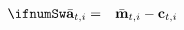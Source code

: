 \begin{eqnarray}
  \label{eq:aBari}
\ifnumSw    \bar{\mathbf{a}}_{t,i} & = & \bar{\mathbf{m}}_{t,i}-\mathbf{c}_{t,i}
\end{eqnarray}
